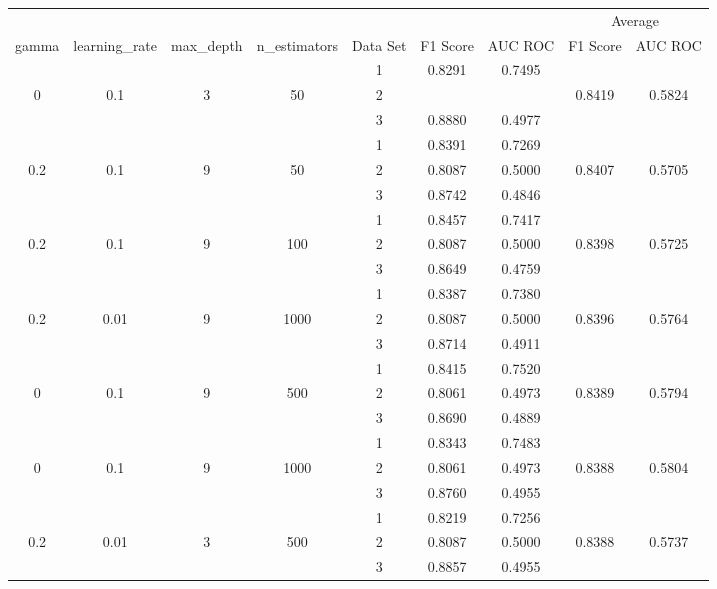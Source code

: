 \documentclass[12pt, twoside]{article}
\begin{document}
\begin{landscape}
\begin{table}[!htbp]
  \centering
  \begin{tabular}{ccccccccc}
  \toprule
  {}	&	{}	&	{}	&	{}	&	{}	&	{}	&	{}	&	\multicolumn{2}{c}{Average} \\
  \cmidrule(r){8-9}
  gamma	&	learning\_rate	&	max\_depth	&	n\_estimators	&	Data Set	&	F1 Score	&	AUC ROC	&	F1 Score	&	AUC ROC \\
  \midrule
  	&	&	&	&	1	&	0.8291	&	0.7495	&		&	 \\
  0	&	0.1	&	3	&	50	&	2	&		&		&	0.8419	&	0.5824 \\
  	&	&	&	&	3	&	0.8880	&	0.4977	&		&	 \\
  	\cmidrule(r){5-9}
  	&	&	&	&	1	&	0.8391	&	0.7269	&		&	 \\
  0.2	&	0.1	&	9	&	50	&	2	&	0.8087	&	0.5000	&	0.8407	&	0.5705 \\
  	&	&	&	&	3	&	0.8742	&	0.4846 	&		&	 \\
  	\cmidrule(r){5-9}
  	&	&	&	&	1	&	0.8457	&	0.7417	&		&	 \\
  0.2	&	0.1	&	9	&	100	&	2	&	0.8087	&	0.5000	&	0.8398	&	0.5725 \\
  	&	&	&	&	3	&	0.8649	&	0.4759	&		&	 \\
  	\cmidrule(r){5-9}
  	&	&	&	&	1	&	0.8387	&	0.7380	&		&	 \\
  0.2	&	0.01	&	9	&	1000	&	2	&	0.8087	&	0.5000	&	0.8396	&	0.5764 \\
  	&	&	&	&	3	&	0.8714	&	0.4911	&		&	 \\
  	\cmidrule(r){5-9}
  	&	&	&	&	1	&	0.8415	&	0.7520	&		&	 \\
  0	&	0.1	&	9	&	500	&	2	&	0.8061	&	0.4973	&	0.8389	&	0.5794 \\
  	&	&	&	&	3	&	0.8690	&	0.4889	&		&	 \\
  	\cmidrule(r){5-9}
  	&	&	&	&	1	&	0.8343	&	0.7483	&		&	 \\
  0	&	0.1	&	9	&	1000	&	2	&	0.8061	&	0.4973	&	0.8388	&	0.5804 \\
  	&	&	&	&	3	&	0.8760	&	0.4955	&		&	 \\
  	\cmidrule(r){5-9}
  	&	&	&	&	1	&	0.8219	&	0.7256	&		&	 \\
  0.2	&	0.01	&	3	&	500	&	2	&	0.8087	&	0.5000	&	0.8388	&	0.5737 \\
  	&	&	&	&	3	&	0.8857	&	0.4955	&		&	 \\

\end{tabular}
\end{table}
\end{landscape}
\end{document}
